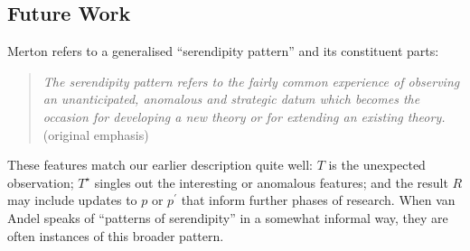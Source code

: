 \subsection{Future Work} \label{sec:futurework} \label{sec:hatching}

Merton \citeyear{merton1948bearing} \cite<cited in>[pp. 195--196]{merton} refers to a generalised ``serendipity pattern''
and its constituent parts:

\begin{quote}
\emph{The serendipity pattern refers to the fairly common experience of observing an \emph{unanticipated}, \emph{anomalous} \emph{and strategic} datum which becomes the occasion for developing a new theory or for extending an existing theory.}~\cite[p. 506]{merton1948bearing} (original emphasis)
\end{quote}

These features match our earlier description quite well: $T$ is the
unexpected observation; $T^\star$ singles out the interesting or
anomalous features; and the result $R$ may include updates to $p$ or
$p^{\prime}$ that inform further phases of research.
%
When van Andel \citeyear{van1994anatomy} speaks of ``patterns of
serendipity'' in a somewhat informal way, they are often instances of
this broader pattern.



